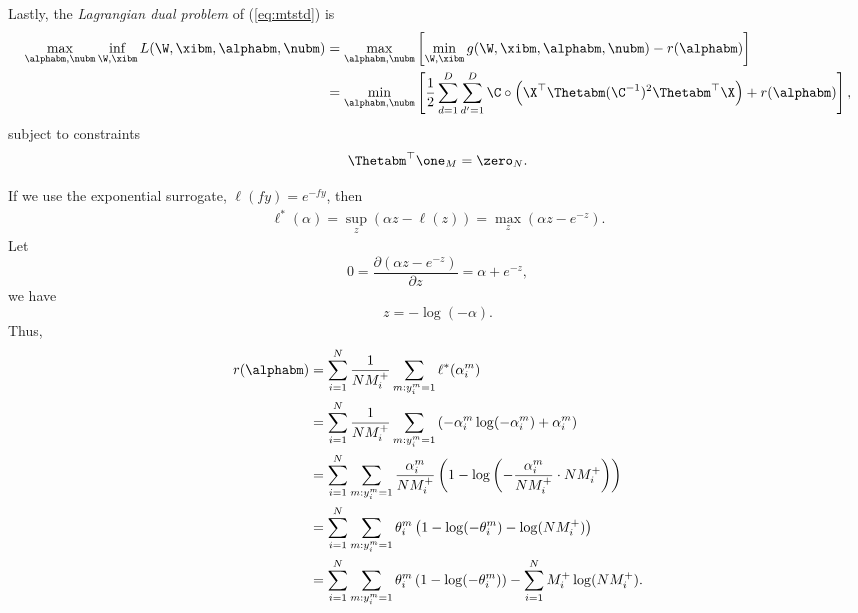 Lastly, the \emph{Lagrangian dual problem} of (\ref{eq:mtstd}) is
\begin{equation}
\label{eq:mtdual}
\begin{aligned}
\max_{\alphabm, \nubm} \inf_{\W, \xibm} L(\W, \xibm, \alphabm, \nubm) 
&= \max_{\alphabm, \nubm} \left[ \min_{\W, \xibm} g(\W, \xibm, \alphabm, \nubm) - r(\alphabm) \right] \\
&= \min_{\alphabm, \nubm} \left[ \frac{1}{2} \sum_{d=1}^{D} \sum_{d'=1}^{D} \C \circ \left( \X^\top \Thetabm (\C^{-1})^2 \Thetabm^\top \X \right) 
   + r(\alphabm) \right], \\
\end{aligned}
\end{equation}
subject to constraints
\begin{equation*}
\Thetabm^\top \one_M = \zero_{N}.
\end{equation*}

If we use the exponential surrogate, \ie $\ell(fy) = e^{-fy}$, then
\begin{equation*}
\begin{aligned}
\ell^*(\alpha) = \sup_z (\alpha z - \ell(z) ) = \max_z (\alpha z - e^{-z}).
\end{aligned}
\end{equation*}
Let 
\begin{equation*}
0 = \frac{\partial (\alpha z - e^{-z})} {\partial z} = \alpha + e^{-z},
\end{equation*}
we have 
\begin{equation*}
z = -\log(-\alpha).
\end{equation*}
Thus, 
\begin{equation*}
\begin{aligned}
r(\alphabm) 
&= \sum_{i = 1}^{N} \frac{1}{N M_i^+} \sum_{m: y_i^m = 1} \ell^*(\alpha_i^m) \\
&= \sum_{i = 1}^{N} \frac{1}{N M_i^+} \sum_{m: y_i^m = 1} \left( -\alpha_i^m \log(-\alpha_i^m) + \alpha_i^m \right) \\
&= \sum_{i = 1}^{N} \sum_{m: y_i^m = 1} \frac{\alpha_i^m}{N M_i^+} \left(1 - \log \left( -\frac{\alpha_i^m}{N M_i^+} 
   \cdot N M_i^+ \right) \right) \\
&= \sum_{i = 1}^{N} \sum_{m: y_i^m = 1} \theta_i^m \left( 1 - \log(-\theta_i^m) - \log(N M_i^+) \right) \\
&= \sum_{i = 1}^{N} \sum_{m: y_i^m = 1} \theta_i^m \left( 1 - \log(-\theta_i^m) \right) - \sum_{i=1}^{N} M_i^+ \log(N M_i^+).
\end{aligned}
\end{equation*}
